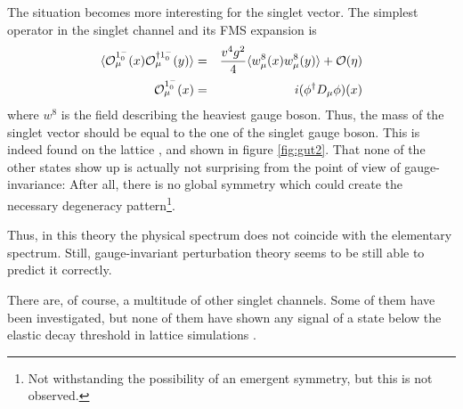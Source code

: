 \documentclass[final,12pt,3p,longtitle]{elsarticle}
\newcommand*{\no}{\noindent}
\newcommand*{\bea}{\begin{eqnarray}}
\newcommand*{\eea}{\end{eqnarray}}
\newcommand*{\nn}{\nonumber}
\newcommand*{\1}{1\!\!\!\bot}
\newcommand*{\op}{{\cal O}}
\begin{document}
The situation becomes more interesting for the singlet vector. The simplest operator in the singlet channel and its FMS expansion is \cite{Torek:2015ssa,Maas:2016ngo}
\bea
\langle \op_\mu^{1^-_0}(x) \op^{\dagger1^-_0}_\mu(y)\rangle&=& \frac{v^4g^2}{4}\langle w_\mu^8(x)w_\mu^8(y)\rangle + \mathcal{O}(\eta)\label{su3w}\\
\op_\mu^{1^-_0}(x) &=& i(\phi^\dagger D_\mu \phi)(x)\nn
\eea
\no where $w^8$ is the field describing the heaviest gauge boson. Thus, the mass of the singlet vector should be equal to the one of the singlet gauge boson. This is indeed found on the lattice \cite{Maas:2016ngo}, and shown in figure \ref{fig:gut2}. That none of the other states show up is actually not surprising from the point of view of gauge-invariance: After all, there is no global symmetry which could create the necessary degeneracy pattern\footnote{Not withstanding the possibility of an emergent symmetry, but this is not observed.}.

Thus, in this theory the physical spectrum does not coincide with the elementary spectrum. Still, gauge-invariant perturbation theory seems to be still able to predict it correctly.

There are, of course, a multitude of other singlet channels. Some of them have been investigated, but none of them have shown any signal of a state below the elastic decay threshold in lattice simulations \cite{Maas:unpublishedtoerek}.
\end{document}
